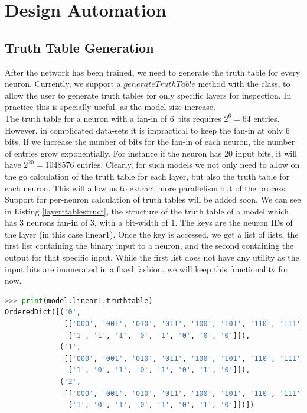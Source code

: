 \chapter{Design Automation}\label{ch:designautomate}
\section{Truth Table Generation}
After the network has been trained, we need to generate the truth table for every neuron. Currently, we support a $generateTruthTable$ method with the class, to allow the user to generate truth tables for only specific layers for inspection. In practice this is specially useful, as the model size increase. \\
The truth table for a neuron with a fan-in of 6 bits requires $2^{6} = 64$ entries. However, in complicated data-sets it is impractical to keep the fan-in at only 6 bits. If we increase the number of bits for the fan-in of each neuron, the number of entries grow exponentially. For instance if the neuron has 20 input bits, it will have $2^{20} = 1048576$ entries. Clearly, for such models we not only need to allow on the go calculation of the truth table for each layer, but also the truth table for each neuron. This will allow us to extract more parallelism out of the process. Support for per-neuron calculation of truth tables will be added soon.
We can see in Listing \ref{layerttablestruct}, the structure of the truth table of a model which has 3 neurons fan-in of 3, with a bit-width of 1. The keys are the neuron IDs of the layer (in this case linear1). Once the key is accessed, we get a list of lists, the first list containing the binary input to a neuron, and the second containing the output for that specific input. While the first list does not have any utility as the input bits are inumerated in a fixed fashion, we will keep this functionality for now.

\begin{lstlisting}[language=Python, caption=Structure of the Truth Table for a layer, label=layerttablestruct]
>>> print(model.linear1.truthtable)
OrderedDict([('0',
              [['000', '001', '010', '011', '100', '101', '110', '111'],
               ['1', '1', '1', '0', '1', '0', '0', '0']]),
             ('1',
              [['000', '001', '010', '011', '100', '101', '110', '111'],
               ['1', '0', '1', '0', '1', '0', '1', '0']]),
             ('2',
              [['000', '001', '010', '011', '100', '101', '110', '111'],
               ['1', '0', '1', '0', '1', '0', '1', '0']])])
\end{lstlisting}

